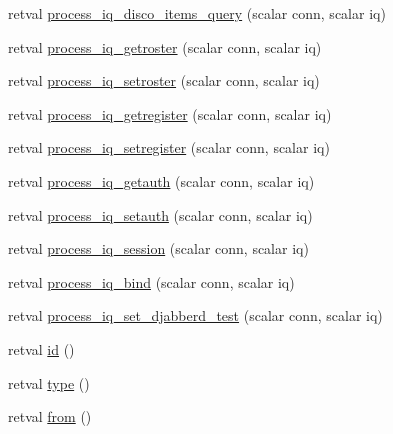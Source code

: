 \begin{Indent}
\begin{DoxyCompactItemize}
\item 
retval \hyperlink{class_d_jabberd_1_1_i_q_a8e9f2e55078ccf76987c798a3d803e43}{process\-\_\-iq\-\_\-disco\-\_\-items\-\_\-query} (scalar conn, scalar iq)
\item 
retval \hyperlink{class_d_jabberd_1_1_i_q_a59c1d9c4b6edcc99abb009ac300a5fe3}{process\-\_\-iq\-\_\-getroster} (scalar conn, scalar iq)
\item 
retval \hyperlink{class_d_jabberd_1_1_i_q_ac0bd5ecb4229029285eff7b7dc640bd2}{process\-\_\-iq\-\_\-setroster} (scalar conn, scalar iq)
\item 
retval \hyperlink{class_d_jabberd_1_1_i_q_a745e1b2f2f35e97ce5e53c75e345f719}{process\-\_\-iq\-\_\-getregister} (scalar conn, scalar iq)
\item 
retval \hyperlink{class_d_jabberd_1_1_i_q_ac576f93b0909d35c2ff3896005c91875}{process\-\_\-iq\-\_\-setregister} (scalar conn, scalar iq)
\item 
retval \hyperlink{class_d_jabberd_1_1_i_q_a0a4c96f172cae74bc7fc6f632cdbd02b}{process\-\_\-iq\-\_\-getauth} (scalar conn, scalar iq)
\item 
retval \hyperlink{class_d_jabberd_1_1_i_q_a92c3712288004bbd659cb105089dc044}{process\-\_\-iq\-\_\-setauth} (scalar conn, scalar iq)
\item 
retval \hyperlink{class_d_jabberd_1_1_i_q_a8131268d54c25049060761ab1315e3f3}{process\-\_\-iq\-\_\-session} (scalar conn, scalar iq)
\item 
retval \hyperlink{class_d_jabberd_1_1_i_q_a8c0bdbe636ef94e740c75d985015d6d9}{process\-\_\-iq\-\_\-bind} (scalar conn, scalar iq)
\item 
retval \hyperlink{class_d_jabberd_1_1_i_q_a02ebb4bef3eb5635bfd60845326d7290}{process\-\_\-iq\-\_\-set\-\_\-djabberd\-\_\-test} (scalar conn, scalar iq)
\item 
retval \hyperlink{class_d_jabberd_1_1_i_q_a06c406f05de71fa64bcadc8beff319c9}{id} ()
\item 
retval \hyperlink{class_d_jabberd_1_1_i_q_a1ee695e90037649e9b1f252275b6ac18}{type} ()
\item 
retval \hyperlink{class_d_jabberd_1_1_i_q_a504a2e942f0bdbcff43cc1509c3278cc}{from} ()
\end{DoxyCompactItemize}
\end{Indent}


